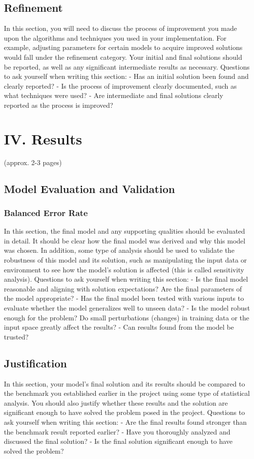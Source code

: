 \documentclass[12pt]{article}
\begin{document}
\subsection{Refinement}
In this section, you will need to discuss the process of improvement you made upon the algorithms and techniques you used in your implementation. For example, adjusting parameters for certain models to acquire improved solutions would fall under the refinement category. Your initial and final solutions should be reported, as well as any significant intermediate results as necessary. Questions to ask yourself when writing this section:
- Has an initial solution been found and clearly reported?
- Is the process of improvement clearly documented, such as what techniques were used?
- Are intermediate and final solutions clearly reported as the process is improved?


\section{IV. Results}
(approx. 2-3 pages)

\subsection{Model Evaluation and Validation}

\subsubsection{Balanced Error Rate}\label{BER}
In this section, the final model and any supporting qualities should be evaluated in detail. It should be clear how the final model was derived and why this model was chosen. In addition, some type of analysis should be used to validate the robustness of this model and its solution, such as manipulating the input data or environment to see how the model’s solution is affected (this is called sensitivity analysis). Questions to ask yourself when writing this section:
- Is the final model reasonable and aligning with solution expectations? Are the final parameters of the model appropriate?
- Has the final model been tested with various inputs to evaluate whether the model generalizes well to unseen data?
- Is the model robust enough for the problem? Do small perturbations (changes) in training data or the input space greatly affect the results?
- Can results found from the model be trusted?

\subsection{Justification}
In this section, your model’s final solution and its results should be compared to the benchmark you established earlier in the project using some type of statistical analysis. You should also justify whether these results and the solution are significant enough to have solved the problem posed in the project. Questions to ask yourself when writing this section:
- Are the final results found stronger than the benchmark result reported earlier?
- Have you thoroughly analyzed and discussed the final solution?
- Is the final solution significant enough to have solved the problem?
\end{document}
